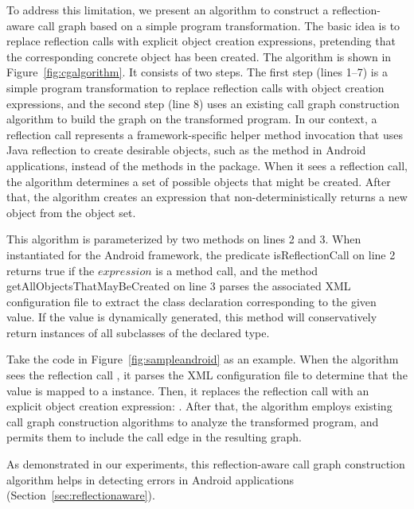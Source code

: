 To address this limitation, we present an algorithm to construct
a reflection-aware call graph based on a simple program transformation.
The basic idea is to replace reflection calls with explicit object
creation expressions, pretending that the corresponding concrete object
has been created.  The algorithm is shown in Figure~\ref{fig:cgalgorithm}.
It consists of two steps. The first step (lines 1--7) is a simple program
transformation to replace reflection calls with object creation expressions, and
the second step (line 8) uses an existing call graph construction algorithm
to build the graph on the transformed program. In our context,
a reflection call represents a framework-specific helper method invocation
that uses Java reflection to create desirable objects, such as
the  method in Android applications, instead
of the methods in the  package.
When it sees a reflection call, the algorithm
determines a set of possible objects that might be created.
After that, the algorithm creates an expression that non-deterministically
returns a new object from the object set.

This algorithm is parameterized by two methods on
lines 2 and 3. When instantiated for the Android framework,
the predicate isReflectionCall on line 2 returns true
if the $expression$ is a  method call, and the method
getAllObjectsThatMayBeCreated on line 3 parses the associated XML configuration
file to extract the class declaration
 corresponding to the given  value. If the 
value is dynamically generated, this method will conservatively
return instances of all subclasses of the declared type.

Take the code in Figure~\ref{fig:sampleandroid} as an example.
When the algorithm sees the reflection call
, it
parses the XML configuration file to determine that the 
value is mapped to a  instance. Then, it
replaces the reflection call
with an explicit object creation expression: .
After that, the algorithm employs existing call graph construction
algorithms to analyze the transformed program, and permits them
to include the call edge  in the resulting graph.

As demonstrated in our experiments, this reflection-aware call
graph construction algorithm helps in detecting errors
in Android applications (Section~\ref{sec:reflectionaware}).


